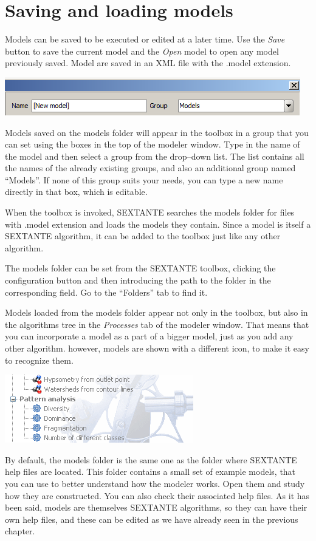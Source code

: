 \section{Saving and loading models}


Models can be saved to be executed or edited at a later time. Use the \emph{Save} button to save the current model and the \emph{Open} model to open any model previously saved. Model are saved in an XML file with the .model extension.

\begin{center}
\includegraphics[width=.8\columnwidth]{models_parameters6.png}
\end{center}

Models saved on the models folder will appear in the toolbox in a group that you can set using the boxes in the top of the modeler window. Type in the name of the model and then select a group from the drop--down list. The list contains all the names of the already existing groups, and also an additional group named ``Models''. If none of this group suits your needs, you can type a new name directly in that box, which is editable. 

When the toolbox is invoked, SEXTANTE searches the models folder for files with .model extension and loads the models they contain. Since a model is itself a SEXTANTE algorithm, it can be added to the toolbox just like any other algorithm.

The models folder can be set from the SEXTANTE toolbox, clicking the configuration button and then introducing the path to the folder in the corresponding field. Go to the ``Folders'' tab to find it.

Models loaded from the models folder appear not only in the toolbox, but also in the algorithms tree in the \emph{Processes} tab of the modeler window. That means that you can incorporate a model as a part of a bigger model, just as you add any other algorithm. however, models are shown with a different icon, to make it easy to recognize them.

\begin{center}
\includegraphics[width=.5\columnwidth]{models_icon.png}
\end{center}

By default, the models folder is the same one as the folder where SEXTANTE help files are located. This folder contains a small set of example models, that you can use to better understand how the modeler works. Open them and study how they are constructed. You can also check their associated help files. As it has been said, models are themselves SEXTANTE algorithms, so they can have their own help files, and these can be edited as we have already seen in the previous chapter.